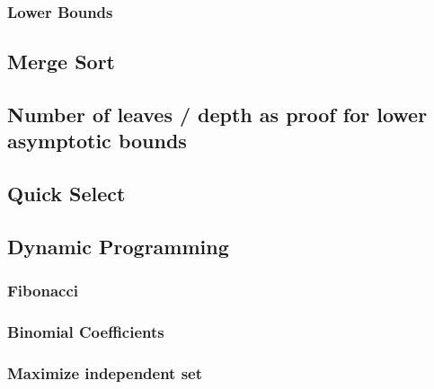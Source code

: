 \documentclass[12pt]{article}
\theoremstyle{definition}
\begin{document}
	\subsubsection{Lower Bounds}

	\subsection{Merge Sort}

	\subsection{Number of leaves / depth as proof for lower asymptotic bounds}

	\subsection{Quick Select}

	\subsection{Dynamic Programming}

	\subsubsection{Fibonacci}

	\subsubsection{Binomial Coefficients}

	\subsubsection{Maximize independent set}
\end{document}
